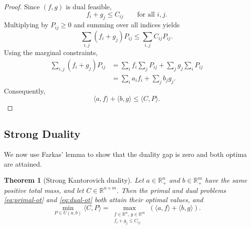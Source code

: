 \documentclass[11pt,a4paper]{article}
\newtheorem{theorem}{Theorem}[section]
\theoremstyle{definition}
\begin{document}
\begin{proof}
Since $(f,g)$ is dual feasible,
\[
f_i+g_j\leq C_{ij}
\qquad\text{for all }i,j.
\]
Multiplying by $P_{ij}\geq0$ and summing over all indices yields
\[
\sum_{i,j}(f_i+g_j)P_{ij}\leq\sum_{i,j}C_{ij}P_{ij}.
\]
Using the marginal constraints,
\[
\begin{aligned}
\sum_{i,j}(f_i+g_j)P_{ij}
&=\sum_i f_i\sum_jP_{ij}+\sum_jg_j\sum_iP_{ij}\\
&=\sum_i a_if_i+\sum_jb_jg_j.
\end{aligned}
\]
Consequently,
\[
\langle a,f\rangle+\langle b,g\rangle\leq\langle C,P\rangle.
\]
\end{proof}

\subsection{Strong Duality}

We now use Farkas' lemma to show that the duality gap is zero and both optima are attained.
\begin{theorem}[Strong Kantorovich duality]
\label{thm:strong-duality}
Let $a\in\mathbb{R}_+^n$ and $b\in\mathbb{R}_+^m$ have the same
positive total mass, and let $C\in\mathbb{R}^{n\times m}$.
Then the primal and dual problems \eqref{eq:primal-ot} and \eqref{eq:dual-ot} both attain
their optimal values, and
\[
\min_{P\in U(a,b)}\langle C,P\rangle=
\max_{\substack{f\in\mathbb{R}^n,\,
g\in\mathbb{R}^m\\
f_i+g_j\leq C_{ij}}}
\left(
\langle a,f\rangle+\langle b,g\rangle
\right).
\]
\end{theorem}
\end{document}
